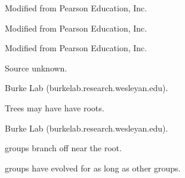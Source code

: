 \documentclass[t]{beamer}
\begin{document}
%
{
\begin{frame}[b]

\tiny Modified from \textcopyright Pearson Education, Inc.
\end{frame}
}
%
{
\begin{frame}[b]

\tiny Modified from \textcopyright Pearson Education, Inc.
\end{frame}
}
%
{
\begin{frame}[b]

\tiny Modified from \textcopyright Pearson Education, Inc.
\end{frame}
}
{
\begin{frame}[b]

\hfill\tiny Source unknown.
\end{frame}
}
%
{
\begin{frame}[b]

\tiny Burke Lab (burkelab.research.wesleyan.edu).
\end{frame}
}
%
%
%
{
\begin{frame}[b]{Trees may have have roots.}

\tiny Burke Lab (burkelab.research.wesleyan.edu).
\end{frame}
}
{
\begin{frame}[b]{ groups branch off near the root.}

\end{frame}
}
%
{
\begin{frame}[b]{ groups have evolved for as long as other groups.}

\end{frame}
}
\end{document}
